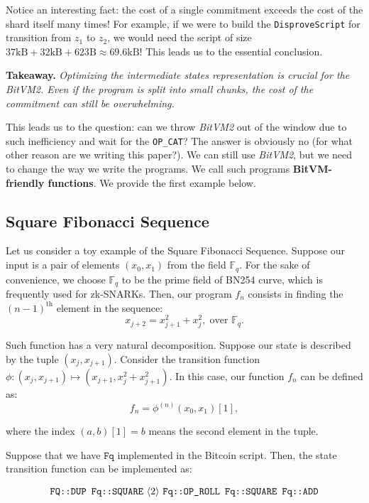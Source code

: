 \documentclass{iacrtrans}
\newcommand{\elem}[1]{\, \langle #1 \rangle \,}
\newcommand{\opcode}[1]{\, \texttt{#1} \,}
\begin{document}
Notice an interesting fact: the cost of a single commitment exceeds the cost of
the shard itself many times! For example, if we were to build the
\texttt{DisproveScript} for transition from $z_1$ to $z_2$, we would need the
script of size $37\text{kB}+32\text{kB}+623\text{B} \approx 69.6\text{kB}$! This
leads us to the essential conclusion.

\textbf{Takeaway.} \textit{Optimizing the intermediate states representation is crucial for the BitVM2. Even if the program is split into small chunks, the cost of the commitment can still be overwhelming.}

This leads us to the question: can we throw \textit{BitVM2} out of the window due to such
inefficiency and wait for the \texttt{OP\_CAT}? The answer is obviously no (for
what other reason are we writing this paper?). We can still use \textit{BitVM2}, but we
need to change the way we write the programs. We call such programs
\textbf{BitVM-friendly functions}. We provide the first example below.

\subsection{Square Fibonacci Sequence}
Let us consider a toy example of the Square Fibonacci Sequence. Suppose our
input is a pair of elements $(x_0,x_1)$ from the field $\mathbb{F}_q$. For the
sake of convenience, we choose $\mathbb{F}_q$ to be the prime field of BN254
curve, which is frequently used for zk-SNARKs. Then, our program $f_n$ consists
in finding the $(n-1)^{\text{th}}$ element in the sequence:
\begin{equation*}
  x_{j+2} = x_{j+1}^2 + x_j^2, \; \text{over $\mathbb{F}_q$.}
\end{equation*}

Such function has a very natural decomposition. Suppose our state is described
by the tuple $(x_j,x_{j+1})$. Consider the transition function $\phi: (x_j,
x_{j+1}) \mapsto (x_{j+1}, x_j^2 + x_{j+1}^2)$. In this case, our function $f_n$
can be defined as:
\begin{equation*}
  f_n = \phi^{(n)}(x_0,x_1)[1],
\end{equation*}

where the index $(a, b)[1] = b$ means the second element in the tuple.

Suppose that we have $\mathtt{Fq}$ implemented in the Bitcoin script. Then, the
state transition function can be implemented as:
\begin{empheqboxed}
  \begin{align*}
    \opcode{\texttt{FQ::DUP}} \, \opcode{\texttt{Fq::SQUARE}} \elem{2} \opcode{\texttt{Fq::OP\_ROLL}} \, \opcode{\texttt{Fq::SQUARE}} \, \opcode{\texttt{Fq::ADD}}
  \end{align*}
\end{empheqboxed}
\end{document}
